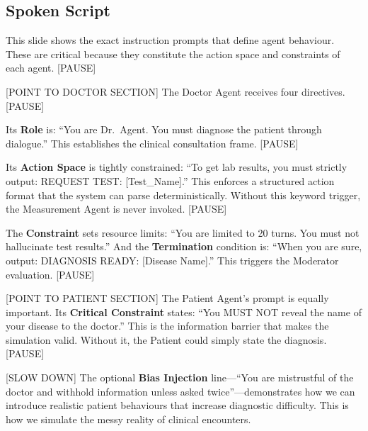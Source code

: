 \documentclass[12pt]{article}
\begin{document}
  \subsection*{Spoken Script}
  \begin{spokenbox}
   This slide shows the exact instruction prompts that define agent behaviour. These are critical because they constitute the action space and constraints of each agent. [PAUSE]

  [POINT TO DOCTOR SECTION] The Doctor Agent receives four directives. [PAUSE]

  Its \textbf{Role} is: ``You are Dr.\ Agent. You must diagnose the patient through dialogue.'' This establishes the clinical consultation frame. [PAUSE]

  Its \textbf{Action Space} is tightly constrained: ``To get lab results, you must strictly output: REQUEST TEST: [Test\_Name].'' This enforces a structured action format that the system can parse deterministically. Without this keyword trigger, the Measurement Agent is never invoked. [PAUSE]

  The \textbf{Constraint} sets resource limits: ``You are limited to 20 turns. You must not hallucinate test results.'' And the \textbf{Termination} condition is: ``When you are sure, output: DIAGNOSIS READY: [Disease Name].'' This triggers the Moderator evaluation. [PAUSE]

  [POINT TO PATIENT SECTION] The Patient Agent's prompt is equally important. Its \textbf{Critical Constraint} states: ``You MUST NOT reveal the name of your disease to the doctor.'' This is the information barrier that makes the simulation valid. Without it, the Patient could simply state the diagnosis. [PAUSE]

  [SLOW DOWN] The optional \textbf{Bias Injection} line---``You are mistrustful of the doctor and withhold information unless asked twice''---demonstrates how we can introduce realistic patient behaviours that increase diagnostic difficulty. This is how we simulate the messy reality of clinical encounters.
  \end{spokenbox}
\end{document}
